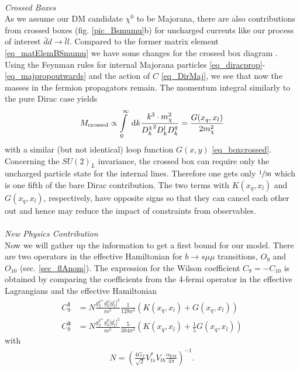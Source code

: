 \\ \textit{Crossed Boxes}\\
\noindent As we assume our DM candidate $\chi^0$ to be Majorana, there are also contributions from crossed boxes (fig. \ref{pic_Bsmumu}b) for uncharged
currents like our process of interest $\bar d d\rightarrow \bar l l$. Compared to the former matrix element \eqref{eq_matElemBSmumu} we have some changes
for the crossed box diagram \cite{1411.6743}. Using the Feynman rules for internal Majorana particles \eqref{eq_diracprop}-\eqref{eq_majpropoutwards} 
and the action of $C$ \eqref{eq_DirMaj}, 
we see that now the masses in the fermion propagators remain. The momentum integral similarly to the pure Dirac case yields
\begin{align}
 M_\text{crossed} \propto \int\limits_0^\infty \; \mathrm{d} k \frac{k^3 \cdot m_\chi^2}{{D^\chi_k}^2D^l_k D^q_k} = \frac{G(x_q,x_l)}{2m_\chi^2}
 \label{eq_crossedBox}
\end{align}
with a similar (but not identical) loop function $G(x,y)$ \eqref{eq_boxcrossed}.
Concerning the $SU(2)_L$ invariance, the crossed box can require only the uncharged particle state for the internal lines. Therefore one gets only $\sfrac{1}{36}$
which is one fifth of the bare Dirac contribution. The two terms with $K(x_q,x_l)$ and $G(x_q,x_l)$, respectively, have opposite signs so that they can cancel
each other out and hence may reduce the impact of constraints from observables.\\
\\ \textit{New Physics Contribution}\\
\noindent Now we will gather up the information to get a first bound for our model. There are two operators in the effective Hamiltonian for $b\rightarrow s\mu\mu$
transitions, $O_9$ and $O_{10}$ (sec. \ref{sec_flAnom}). The expression for the Wilson coefficient $C_9 = -C_{10}$ \cite{1408.1627} is obtained by comparing the 
coefficients from the 4-fermi operator in the effective Lagrangians and the effective Hamiltonian
\begin{align}
 C_9^{\textbf{1}} &= N \frac{g_2^{q*}g_3^q|g_2^l|^2}{m^2} \frac{1}{128\pi^2} \left(K(x_q,x_l) + G(x_q,x_l)\right)\\
 C_9^{\textbf{3}} &= N \frac{g_2^{q*}g_3^q|g_2^l|^2}{m^2} \frac{5}{384\pi^2} \left(K(x_q,x_l) + \frac15 G(x_q,x_l)\right)
 \label{eq_WilsonBsmumu}
\end{align}
with
\begin{align}
 N = \left(\frac{4G_F}{\sqrt{2}} V_{ts}^*V_{tb} \frac{\alpha_\text{EM}}{4\pi}\right)^{-1}.
\end{align}
